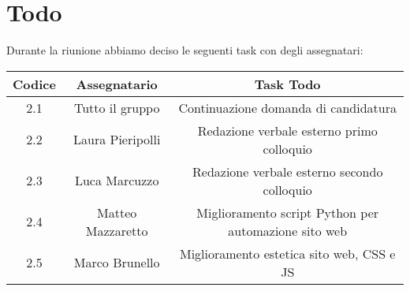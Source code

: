 \section{Todo}

Durante la riunione abbiamo deciso le seguenti task con degli assegnatari:

\vspace{0.5cm}

\begin{table}[htbp]
	\begin{tabular}{|c|c|c|}
		\hline
		\rowcolor[gray]{0.9}
		Codice & Assegnatario & Task Todo \\
		\hline
		2.1 & Tutto il gruppo & Continuazione domanda di candidatura \\
		\hline
		2.2 & Laura Pieripolli & Redazione verbale esterno primo colloquio \\
		\hline
		2.3 & Luca Marcuzzo & Redazione verbale esterno secondo colloquio \\
		\hline
		2.4 & Matteo Mazzaretto & Miglioramento script Python per automazione sito web \\
		\hline
		2.5 & Marco Brunello & Miglioramento estetica sito web, CSS e JS \\
		\hline
	\end{tabular}
\end{table}